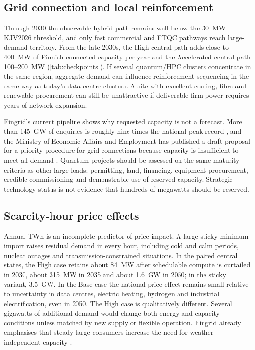 \documentclass[11pt,a4paper]{article}
\begin{document}
\subsection{Grid connection and local reinforcement}
Through 2030 the observable hybrid path remains well below the 30~MW KJV2026 threshold, and only fast commercial and FTQC pathways reach large-demand territory. From the late 2030s, the High central path adds close to 400~MW of Finnish connected capacity per year and the Accelerated central path 100--200~MW (\cref{tab:checkpoints}). If several quantum/HPC clusters concentrate in the same region, aggregate demand can influence reinforcement sequencing in the same way as today's data-centre clusters. A site with excellent cooling, fibre and renewable procurement can still be unattractive if deliverable firm power requires years of network expansion.

Fingrid's current pipeline shows why requested capacity is not a forecast. More than 145~GW of enquiries is roughly nine times the national peak record \citep{fingrid2026prospects}, and the Ministry of Economic Affairs and Employment has published a draft proposal for a priority procedure for grid connections because capacity is insufficient to meet all demand \citep{fingrid2026q3}. Quantum projects should be assessed on the same maturity criteria as other large loads: permitting, land, financing, equipment procurement, credible commissioning and demonstrable use of reserved capacity. Strategic-technology status is not evidence that hundreds of megawatts should be reserved.

\subsection{Scarcity-hour price effects}
Annual TWh is an incomplete predictor of price impact. A large sticky minimum import raises residual demand in every hour, including cold and calm periods, nuclear outages and transmission-constrained situations. In the paired central states, the High case retains about 84~MW after schedulable compute is curtailed in 2030, about 315~MW in 2035 and about 1.6~GW in 2050; in the sticky variant, 3.5~GW. In the Base case the national price effect remains small relative to uncertainty in data centres, electric heating, hydrogen and industrial electrification, even in 2050. The High case is qualitatively different. Several gigawatts of additional demand would change both energy and capacity conditions unless matched by new supply or flexible operation. Fingrid already emphasises that steady large consumers increase the need for weather-independent capacity \citep{fingrid2026q3}.
\end{document}
